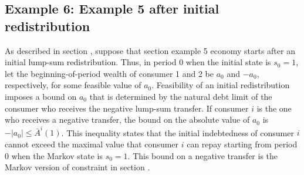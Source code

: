 




\subsection{Example 6: Example 5 after initial redistribution}
As described in section , suppose that section   example 5
economy starts after an initial lump-sum redistribution.
Thus, in period $0$ when the initial state
is $s_0=1$, let the beginning-of-period wealth of 
consumer 1 and 2 be $a_0$ and $-a_0$, respectively,
for some feasible value of $a_0$. Feasibility of an initial redistribution imposes a bound on $a_0$ that is 
determined by the natural debt limit
of the consumer who receives the negative lump-sum
transfer. If consumer $i$ is the one who receives
a negative transfer, the bound on the absolute value
of $a_0$ is $-|a_0|\leq \bar A^i(1)$. This inequality states that the initial indebtedness of consumer $i$ cannot 
exceed the maximal value that consumer $i$ can repay 
starting from period $0$ when the Markov state is 
$s_0=1$. This bound on a negative transfer is the
Markov version of constraint 
in section .

